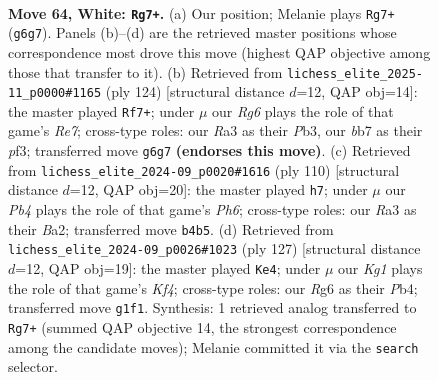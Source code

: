 \documentclass[11pt]{article}
\begin{document}
\clearpage

\begin{figure}[p]\centering
\begin{subfigure}{0.46\textwidth}\centering
\resizebox{\linewidth}{!}{%
\newchessgame
\chessboard[
  setfen={8/1b1k4/6R1/8/1P6/R7/1r6/6K1 w - - 1 64},
  showmover=false,
  pgfstyle=straightmove, color=movearrow, markmove={g6-g7}
]}
\caption{}
\end{subfigure}\hfill
\begin{subfigure}{0.46\textwidth}\centering
\resizebox{\linewidth}{!}{%
\newchessgame
\chessboard[
  setfen={8/4R2K/8/P7/5k2/1P3p2/r7/8 w - - 3 63},
  showmover=false,
  pgfstyle=straightmove, color=movearrow, markmove={e7-f7}
]}
\caption{}
\end{subfigure}
\\[4pt]
\begin{subfigure}{0.46\textwidth}\centering
\resizebox{\linewidth}{!}{%
\newchessgame
\chessboard[
  setfen={R7/4k3/7P/8/7r/4K3/B7/8 w - - 3 56},
  showmover=false,
  pgfstyle=straightmove, color=movearrow, markmove={h6-h7}
]}
\caption{}
\end{subfigure}\hfill
\begin{subfigure}{0.46\textwidth}\centering
\resizebox{\linewidth}{!}{%
\newchessgame
\chessboard[
  setfen={8/1r6/7R/5k2/1p5p/8/8/6BK b - - 0 64},
  showmover=false,
  pgfstyle=straightmove, color=movearrow, markmove={f5-e4}
]}
\caption{}
\end{subfigure}
\caption{\textbf{Move 64, White: \texttt{Rg7+}.} (a) Our position; Melanie plays \texttt{Rg7+} (\texttt{g6g7}). Panels (b)--(d) are the retrieved master positions whose correspondence most drove this move (highest QAP objective among those that transfer to it). (b) Retrieved from \texttt{lichess\_elite\_2025-11\_p0000\#1165} (ply 124) [structural distance $d$=12, QAP obj=14]: the master played \texttt{Rf7+}; under $\mu$ our \emph{Rg6} plays the role of that game's \emph{Re7}; cross-type roles: our \emph{R}a3 as their \emph{P}b3, our \emph{b}b7 as their \emph{p}f3; transferred move \texttt{g6g7} \textbf{(endorses this move)}. (c) Retrieved from \texttt{lichess\_elite\_2024-09\_p0020\#1616} (ply 110) [structural distance $d$=12, QAP obj=20]: the master played \texttt{h7}; under $\mu$ our \emph{Pb4} plays the role of that game's \emph{Ph6}; cross-type roles: our \emph{R}a3 as their \emph{B}a2; transferred move \texttt{b4b5}. (d) Retrieved from \texttt{lichess\_elite\_2024-09\_p0026\#1023} (ply 127) [structural distance $d$=12, QAP obj=19]: the master played \texttt{Ke4}; under $\mu$ our \emph{Kg1} plays the role of that game's \emph{Kf4}; cross-type roles: our \emph{R}g6 as their \emph{P}b4; transferred move \texttt{g1f1}. Synthesis: 1 retrieved analog transferred to \texttt{Rg7+} (summed QAP objective 14, the strongest correspondence among the candidate moves); Melanie committed it via the \texttt{search} selector.}
\label{fig:thought-m126}
\end{figure}
\end{document}
